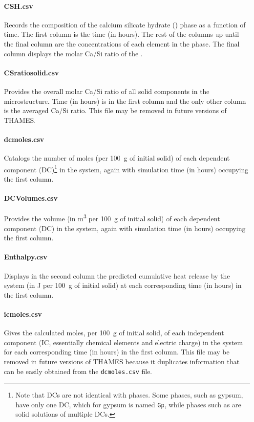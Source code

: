 \documentclass{article}
\newcommand{\us}{\underline{\phantom{X}}}
\begin{document}
{\paragraph{{\us}CSH.csv} Records the composition of the calcium silicate
hydrate () phase as a function of time. The first column is the time (in hours).
The rest of the columns up until the final column are the concentrations
of each element in the  phase. The final column displays the
molar Ca/Si ratio of the .

\paragraph{{\us}CSratio{\us}solid.csv} Provides the overall molar Ca/Si ratio of all
solid components in the microstructure. Time (in hours) is in the first column
and the only other column is the averaged Ca/Si ratio. This file may be
removed in future versions of THAMES.

\paragraph{{\us}dcmoles.csv} Catalogs the number of moles (per \qty{100}{\gram}
of initial solid) of each dependent component (DC)\footnote{Note that DCs are
	not identical with phases. Some phases, such as gypsum, have only one
	DC, which for gypsum is named \texttt{Gp}, while phases such as 
	are solid solutions of multiple DCs.}
in the system, again with
simulation time (in hours) occupying the first column.

\paragraph{{\us}DCVolumes.csv} Provides the volume (in \unit{\meter\cubed} per
\qty{100}{\gram} of initial solid) of each dependent component (DC) in the
system, again with simulation time (in hours) occupying the first column.

\paragraph{{\us}Enthalpy.csv} Displays in the second column the predicted cumulative heat release
by the system (in \unit{\joule} per \qty{100}{\gram} of initial solid) at each
corresponding time (in hours) in the first column.

\paragraph{{\us}icmoles.csv} Gives the calculated moles, per \qty{100}{\gram}
of initial solid, of each independent
component (IC, essentially chemical elements and electric charge) in the system
for each corresponding time (in hours) in the first column. This file may be
removed in future versions of THAMES because it duplicates information that
can be easily obtained from the \texttt{{\us}dcmoles.csv} file.

}
\end{document}
